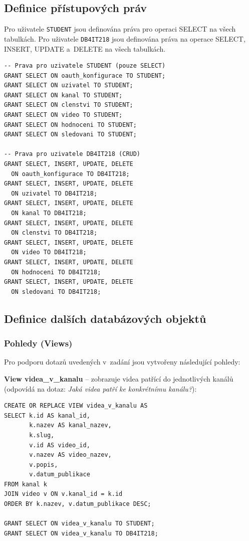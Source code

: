 \documentclass[12pt,a4paper]{article}
\begin{document}
\newpage

\subsection{Definice přístupových práv}

Pro uživatele \texttt{STUDENT} jsou definována práva pro operaci SELECT na všech tabulkách.
Pro uživatele \texttt{DB4IT218} jsou definována práva na operace SELECT, INSERT, UPDATE
a~DELETE na všech tabulkách.

\begin{lstlisting}
-- Prava pro uzivatele STUDENT (pouze SELECT)
GRANT SELECT ON oauth_konfigurace TO STUDENT;
GRANT SELECT ON uzivatel TO STUDENT;
GRANT SELECT ON kanal TO STUDENT;
GRANT SELECT ON clenstvi TO STUDENT;
GRANT SELECT ON video TO STUDENT;
GRANT SELECT ON hodnoceni TO STUDENT;
GRANT SELECT ON sledovani TO STUDENT;

-- Prava pro uzivatele DB4IT218 (CRUD)
GRANT SELECT, INSERT, UPDATE, DELETE
  ON oauth_konfigurace TO DB4IT218;
GRANT SELECT, INSERT, UPDATE, DELETE
  ON uzivatel TO DB4IT218;
GRANT SELECT, INSERT, UPDATE, DELETE
  ON kanal TO DB4IT218;
GRANT SELECT, INSERT, UPDATE, DELETE
  ON clenstvi TO DB4IT218;
GRANT SELECT, INSERT, UPDATE, DELETE
  ON video TO DB4IT218;
GRANT SELECT, INSERT, UPDATE, DELETE
  ON hodnoceni TO DB4IT218;
GRANT SELECT, INSERT, UPDATE, DELETE
  ON sledovani TO DB4IT218;
\end{lstlisting}

\newpage

\subsection{Definice dalších databázových objektů}

\subsubsection*{Pohledy (Views)}

Pro podporu dotazů uvedených v~zadání jsou vytvořeny následující pohledy:

\textbf{View videa\_v\_kanalu} -- zobrazuje videa patřící do jednotlivých kanálů
(odpovídá na dotaz: \emph{Jaká videa patří ke konkrétnímu kanálu?}):

\begin{lstlisting}
CREATE OR REPLACE VIEW videa_v_kanalu AS
SELECT k.id AS kanal_id,
       k.nazev AS kanal_nazev,
       k.slug,
       v.id AS video_id,
       v.nazev AS video_nazev,
       v.popis,
       v.datum_publikace
FROM kanal k
JOIN video v ON v.kanal_id = k.id
ORDER BY k.nazev, v.datum_publikace DESC;

GRANT SELECT ON videa_v_kanalu TO STUDENT;
GRANT SELECT ON videa_v_kanalu TO DB4IT218;
\end{lstlisting}
\end{document}
